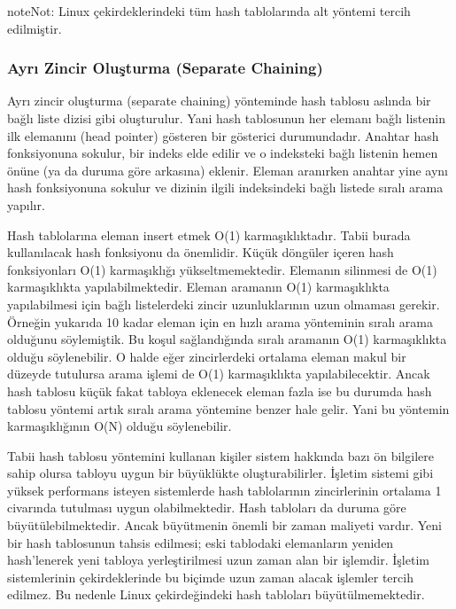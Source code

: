 \documentclass[a4paper,10pt,turkish]{sphinxmanual}
\begin{document}
\begin{sphinxadmonition}{note}{Not:}
\sphinxAtStartPar
Linux çekirdeklerindeki tüm hash tablolarında  alt yöntemi tercih edilmiştir.
\end{sphinxadmonition}


\subsubsection{Ayrı Zincir Oluşturma (Separate Chaining)}
\label{\detokenize{kernellinkedlistandhashtable:ayri-zincir-olusturma-separate-chaining}}
\sphinxAtStartPar
Ayrı zincir oluşturma (separate chaining) yönteminde hash tablosu aslında bir bağlı liste
dizisi gibi oluşturulur. Yani hash tablosunun her elemanı bağlı listenin ilk elemanını
(head pointer) gösteren bir gösterici durumundadır. Anahtar hash fonksiyonuna sokulur, bir
indeks elde edilir ve o indeksteki bağlı listenin hemen önüne (ya da duruma göre arkasına)
eklenir. Eleman aranırken anahtar yine aynı hash fonksiyonuna sokulur ve dizinin ilgili
indeksindeki bağlı listede sıralı arama yapılır.

\sphinxAtStartPar
Hash tablolarına eleman insert etmek O(1) karmaşıklıktadır. Tabii burada kullanılacak hash
fonksiyonu da önemlidir. Küçük döngüler içeren hash fonksiyonları O(1) karmaşıklığı
yükseltmemektedir. Elemanın silinmesi de O(1) karmaşıklıkta yapılabilmektedir. Eleman
aramanın O(1) karmaşıklıkta yapılabilmesi için bağlı listelerdeki zincir uzunluklarının
uzun olmaması gerekir. Örneğin yukarıda 10 kadar eleman için en hızlı arama yönteminin
sıralı arama olduğunu söylemiştik. Bu koşul sağlandığında sıralı aramanın O(1)
karmaşıklıkta olduğu söylenebilir. O halde eğer zincirlerdeki ortalama eleman makul bir
düzeyde tutulursa arama işlemi de O(1) karmaşıklıkta yapılabilecektir. Ancak hash tablosu
küçük fakat tabloya eklenecek eleman fazla ise bu durumda hash tablosu yöntemi artık sıralı
arama yöntemine benzer hale gelir. Yani bu yöntemin 
karmaşıklığının O(N) olduğu söylenebilir.

\sphinxAtStartPar
Tabii hash tablosu yöntemini kullanan kişiler sistem hakkında bazı ön bilgilere sahip olursa
tabloyu uygun bir büyüklükte oluşturabilirler. İşletim sistemi gibi yüksek performans
isteyen sistemlerde hash tablolarının zincirlerinin ortalama 1 civarında tutulması uygun
olabilmektedir. Hash tabloları da duruma göre büyütülebilmektedir. Ancak büyütmenin önemli
bir zaman maliyeti vardır. Yeni bir hash tablosunun tahsis edilmesi; eski tablodaki
elemanların yeniden hash’lenerek yeni tabloya yerleştirilmesi uzun zaman alan bir işlemdir.
İşletim sistemlerinin çekirdeklerinde bu biçimde uzun zaman alacak işlemler tercih edilmez.
Bu nedenle Linux çekirdeğindeki hash tabloları büyütülmemektedir.
\end{document}
